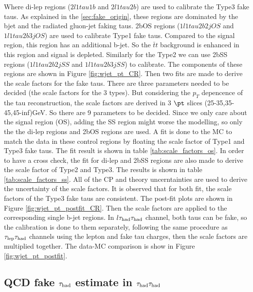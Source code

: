 Where di-lep regions ($2l1tau1b$ and $2l1tau2b$) are used to calibrate the Type3 fake taus. As explained in the \ref{sec:fake_origin}, these regions are dominated by the bjet and the radiated gluon-jet faking taus. 2bOS regions ($1l1tau2b2j OS$ and $1l1tau2b3j OS$) are used to calibrate Type1 fake taus. Compared to the signal region, this region has an additional b-jet. So the $\bar{t}t$ background is enhanced in this region and signal is depleted. Similarly for the Type2 we can use 2bSS regions ($1l1tau2b2j SS$ and $1l1tau2b3j SS$) to calibrate. The components of these regions are shown in Figure \ref{fig:wjet_pt_CR}. Then two fits are made to derive the scale factors for the fake taus. There are three parameters needed to be decided (the scale factors for the 3 types). But considering the $p_{T}$ depencence of the tau reconstruction, the scale factors are derived in 3 $\pt$ slices (25-35,35-45,45-inf)GeV. So there are 9 parameters to be decided. Since we only care about the signal region (OS), adding the SS region might worse the modelling, so only the the di-lep regions and 2bOS regions are used. A fit is done to the MC to match the data in these control regions by floating the scale factor of Type1 and Type3 fake taus. The fit result is shown in table \ref{tab:scale_factors_os}. In order to have a cross check, the fit for di-lep and 2bSS regions are also made to derive the scale factor of Type2 and Type3. The results is shown in table \ref{tab:scale_factors_ss}. All of the CP and theory uncerntainties are used to derive the uncertainty of the scale factors. It is observed that for both fit, the scale factors of the Type3 fake taus are consistent. The post-fit plots are shown in Figure \ref{fig:wjet_pt_postfit_CR}. Then the scale factors are applied to the corresponding single b-jet regions. In $l\tau_\text{had}{}\tau_\text{had}$ channel, both taus can be fake, so the calibration is done to them separately, following the same procedure as $\tau_\text{lep}{}\tau_\text{had}$ channels using the lepton and fake tau charges, then the scale factors are multiplied together. The data-MC comparison is show in Figure \ref{fig:wjet_pt_postfit}.








\subsection{QCD fake $\tau_\text{had}$ estimate in $\tau_\text{had}{}\tau_\text{had}$}
\label{sec:ss_method}

